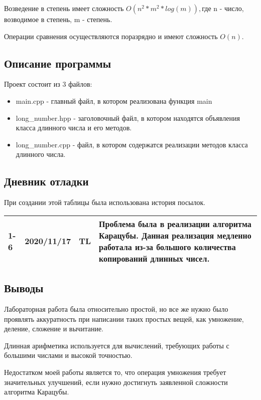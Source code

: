 \documentclass[12pt]{article}
\begin{document}
Возведение в степень имеет сложность $O(n^2 * m^2 * log(m)), $где n - число, возводимое в степень, m - степень.

Операции сравнения осуществляются поразрядно и имеют сложность $O(n)$.

\subsection*{Описание программы}

Проект состоит из 3 файлов:
\begin{itemize}
    \item main.cpp - главный файл, в котором реализована функция main
    \item long\_number.hpp - заголовочный файл, в котором находятся объявления класса длинного числа и его методов.
    \item long\_number.cpp - файл, в котором содержатся реализации методов класса длинного числа.
\end{itemize}

\subsection*{Дневник отладки}

При создании этой таблицы была использована история посылок.


\begin{table}[!htb]
\begin{tabular}{|m{2cm}|m{2cm}|m{3cm}|m{9cm}|}
\hline
1-6 & 2020/11/17 & TL & Проблема была в реализации алгоритма Карацубы. Данная реализация медленно работала из-за большого количества копирований длинных чисел.\\
\hline
\end{tabular}
\end{table}

\subsection*{Выводы}

Лабораторная работа была относительно простой, но все же нужно было проявлять аккуратность при написании таких простых вещей, как умножение, деление, сложение и вычитание.

Длинная арифметика используется для вычислений, требующих работы с большими числами и высокой точностью.

Недостатком моей работы является то, что операция умножения требует значительных улучшений, если нужно достигнуть заявленной сложности алгоритма Карацубы.
\end{document}
